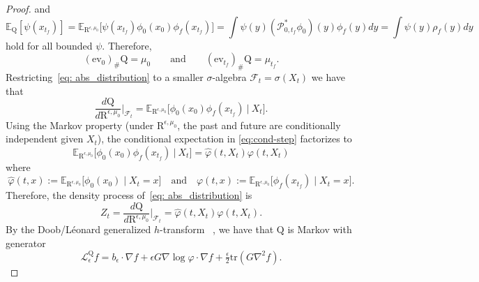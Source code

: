 \documentclass{amsart}
\numberwithin{equation}{section}
\begin{document}
\begin{proof}
and
\begin{equation*}
\mathbb E_{\mathrm{Q}}[\psi( x_{t_f})]
=\mathbb E_{\mathrm{R}^{\epsilon,\mu_0}} \big[\psi( x_{t_f})\phi_0( x_0)\phi_f( x_{t_f})\big]
 =\int \psi(y)(\mathscr P_{0,t_f}^* \phi_0)(y)\phi_f(y)dy
 =\int \psi(y)\rho_f(y)dy    
\end{equation*}
hold for all bounded $\psi$. Therefore, 
\begin{equation}\label{eq: marginal_constraint}
( \mathrm{ev}_0)_{\#}\mathrm{Q}=\mu_0\qquad\text{and}\qquad ( \mathrm{ev}_{t_f})_{\#}\mathrm{Q}=\mu_{t_f}.    
\end{equation}
Restricting~\eqref{eq: abs_distribution} to a smaller $\sigma$-algebra $\mathcal F_{t}=\sigma( X_t)$ we have that 
\begin{equation}\label{eq:cond-step}
\frac{d\mathrm{Q}}{d\mathrm{R}^{\epsilon,\mu_0}}\Big|_{\mathcal F_{t}}
= \mathbb E_{\mathrm{R}^{\epsilon,\mu_0}} \big[\phi_0( x_0)\phi_f( x_{t_f})\ \big|\  X_t\big].   
\end{equation}
Using the Markov property (under $\mathrm{R}^{\epsilon,\mu_0}$, the past and future are conditionally
independent given $X_t$), the conditional expectation in \eqref{eq:cond-step} factorizes to
\[
\mathbb E_{\mathrm{R}^{\epsilon,\mu_0}} \big[\phi_0( x_0)\phi_f( x_{t_f})\ \big|\  X_t\big]
= \widehat\varphi(t, X_t)\varphi(t, X_t)
\]
where
\begin{equation}\label{eq: conditional expectation}
\widehat\varphi(t,x):=\mathbb E_{\mathrm{R}^{\epsilon,\mu_0}} \big[\phi_0( x_0)\mid  X_t=x\big] \quad\text{and}\quad%
\varphi(t,x):=\mathbb E_{\mathrm{R}^{\epsilon,\mu_0}} \big[\phi_f( x_{t_f})\mid  X_t=x\big].%
\end{equation}
Therefore, the density process of~\eqref{eq: abs_distribution} is 
\[
Z_t=\frac{d\mathrm{Q}}{d\mathrm{R}^{\epsilon,\mu_0}}\Big|_{\mathcal F_t}=\widehat\varphi(t, X_t)\varphi(t, X_t).
\]
By the Doob/L\'eonard generalized $h$-transform~ \cite{Doob1984,Leonard2011StochasticH,Leonard2014Survey}, we have that $\mathrm{Q}$ is Markov with generator
\[
\mathcal L_\epsilon^{\mathrm{Q}} f=b_\epsilon\cdot\nabla f+\epsilon G\nabla\log\varphi\cdot\nabla f+\tfrac{\epsilon}{2}\mathrm{tr}(G\nabla^2 f).
\]
\end{proof}
\end{document}
